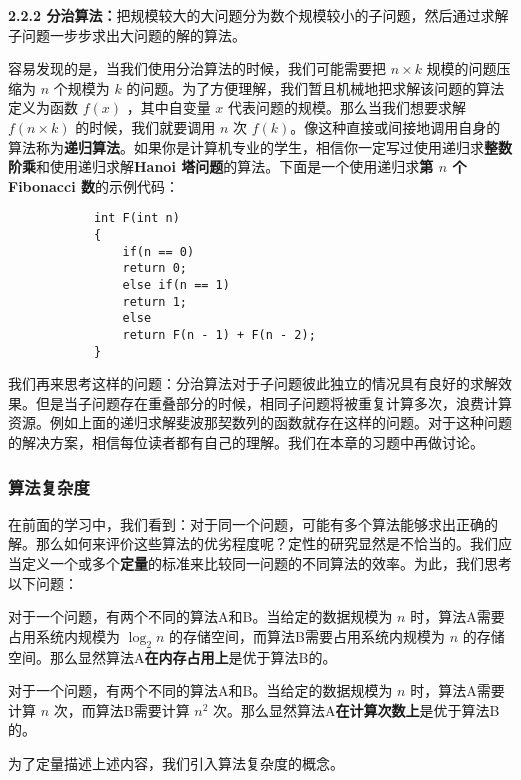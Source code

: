 \documentclass[a5paper]{ctexart}
\begin{document}
		\newpage
		
		\textbf{2.2.2 分治算法：}把规模较大的大问题分为数个规模较小的子问题，然后通过求解子问题一步步求出大问题的解的算法。
		
		容易发现的是，当我们使用分治算法的时候，我们可能需要把 $n\times k$ 规模的问题压缩为 $n$ 个规模为 $k$ 的问题。为了方便理解，我们暂且机械地把求解该问题的算法定义为函数 $f(x)$ ，其中自变量 $x$ 代表问题的规模。那么当我们想要求解 $f(n \times k)$ 的时候，我们就要调用 $n$ 次 $f(k)$。像这种直接或间接地调用自身的算法称为\textbf{递归算法}。如果你是计算机专业的学生，相信你一定写过使用递归求\textbf{整数阶乘}和使用递归求解\textbf{Hanoi 塔问题}的算法。下面是一个使用递归求\textbf{第 $n$ 个 Fibonacci 数}的示例代码：
		
		\begin{verbatim}
			int F(int n)
			{
				if(n == 0)
				return 0;
				else if(n == 1)
				return 1;
				else
				return F(n - 1) + F(n - 2);
			}
		\end{verbatim}
		
		我们再来思考这样的问题：分治算法对于子问题彼此独立的情况具有良好的求解效果。但是当子问题存在重叠部分的时候，相同子问题将被重复计算多次，浪费计算资源。例如上面的递归求解斐波那契数列的函数就存在这样的问题。对于这种问题的解决方案，相信每位读者都有自己的理解。我们在本章的习题中再做讨论。
		
		\newpage
		
		\subsubsection{算法复杂度}
		
		在前面的学习中，我们看到：对于同一个问题，可能有多个算法能够求出正确的解。那么如何来评价这些算法的优劣程度呢？定性的研究显然是不恰当的。我们应当定义一个或多个\textbf{定量}的标准来比较同一问题的不同算法的效率。为此，我们思考以下问题：
		
		对于一个问题，有两个不同的算法A和B。当给定的数据规模为 $n$ 时，算法A需要占用系统内规模为 $\log _2n$ 的存储空间，而算法B需要占用系统内规模为 $n$ 的存储空间。那么显然算法A\textbf{在内存占用上}是优于算法B的。
		
		对于一个问题，有两个不同的算法A和B。当给定的数据规模为 $n$ 时，算法A需要计算 $n$ 次，而算法B需要计算 $n^2$ 次。那么显然算法A\textbf{在计算次数上}是优于算法B的。
		
		为了定量描述上述内容，我们引入算法复杂度的概念。
		
		\vspace{12pt}
		
\end{document}
